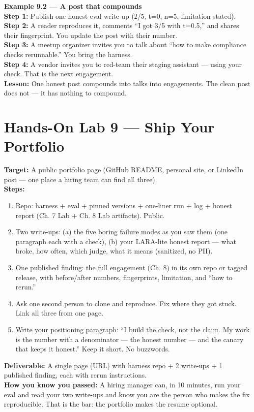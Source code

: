 \begin{examplebox}
\textbf{Example 9.2 — A post that compounds}\\
\textbf{Step 1:} Publish one honest eval write-up (2/5, t=0, n=5, limitation stated).\\
\textbf{Step 2:} A reader reproduces it, comments ``I got 3/5 with t=0.5,'' and shares their fingerprint. You update the post with their number.\\
\textbf{Step 3:} A meetup organizer invites you to talk about ``how to make compliance checks rerunnable.'' You bring the harness.\\
\textbf{Step 4:} A vendor invites you to red-team their staging assistant — using your check. That is the next engagement.\\
\textbf{Lesson:} One honest post compounds into talks into engagements. The clean post does not — it has nothing to compound.
\end{examplebox}

\section{Hands-On Lab 9 — Ship Your Portfolio}
\begin{labbox}
\textbf{Target:} A public portfolio page (GitHub README, personal site, or LinkedIn post — one place a hiring team can find all three).\\[4pt]
\textbf{Steps:}
\begin{enumerate}
\item Repo: harness + eval + pinned versions + one-liner run + log + honest report (Ch. 7 Lab + Ch. 8 Lab artifacts). Public.
\item Two write-ups: (a) the five boring failure modes as you saw them (one paragraph each with a check), (b) your LARA-lite honest report — what broke, how often, which judge, what it means (sanitized, no PII).
\item One published finding: the full engagement (Ch. 8) in its own repo or tagged release, with before/after numbers, fingerprints, limitation, and ``how to rerun.''
\item Ask one second person to clone and reproduce. Fix where they got stuck. Link all three from one page.
\item Write your positioning paragraph: ``I build the check, not the claim. My work is the number with a denominator — the honest number — and the canary that keeps it honest.'' Keep it short. No buzzwords.
\end{enumerate}
\textbf{Deliverable:} A single page (URL) with harness repo + 2 write-ups + 1 published finding, each with rerun instructions.\\[2pt]
\textbf{How you know you passed:} A hiring manager can, in 10 minutes, run your eval and read your two write-ups and know you are the person who makes the fix reproducible. That is the bar: the portfolio makes the resume optional.
\end{labbox}

